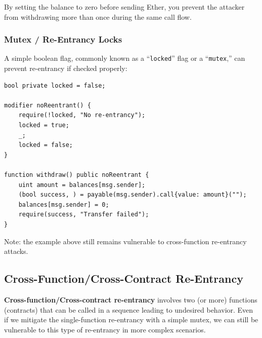 \documentclass[12pt]{article}
\newcommand{\codeinline}[1]{\texttt{#1}}
\begin{document}
\noindent
By setting the balance to zero before sending Ether, you prevent the attacker from withdrawing more than once during the same call flow.

\subsubsection*{Mutex / Re-Entrancy Locks}

A simple boolean flag, commonly known as a “\codeinline{locked}” flag or a “\codeinline{mutex},” can prevent re-entrancy if checked properly:

\noindent
\begin{minipage}{\textwidth}
\begin{lstlisting}[language=Solidity]
bool private locked = false;

modifier noReentrant() {
    require(!locked, "No re-entrancy");
    locked = true;
    _;
    locked = false;
}

function withdraw() public noReentrant {
    uint amount = balances[msg.sender];
    (bool success, ) = payable(msg.sender).call{value: amount}("");
    balances[msg.sender] = 0;
    require(success, "Transfer failed");
}
\end{lstlisting}
\end{minipage}

\noindent
Note: the example above still remains vulnerable to cross-function re-entrancy attacks.

\subsection{Cross-Function/Cross-Contract Re-Entrancy}

\textbf{Cross-function/Cross-contract re-entrancy} involves two (or more) functions (contracts) that can be called in a sequence leading to undesired behavior. Even if we mitigate the single-function re-entrancy with a simple mutex, we can still be vulnerable to this type of re-entrancy in more complex scenarios.
\end{document}
